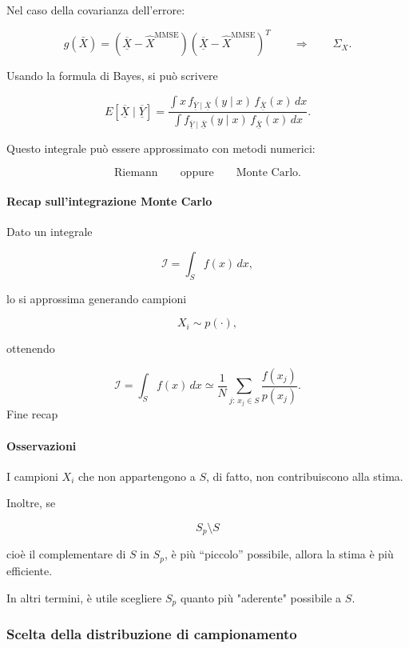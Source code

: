 \documentclass[11pt,a4paper]{article}
\begin{document}
Nel caso della covarianza dell'errore:

\[
g(\bar X)
=
(\overline{\underline{X}}-\hat X^{\mathrm{MMSE}})
(\overline{\underline{X}}-\hat X^{\mathrm{MMSE}})^T
\qquad \Rightarrow \qquad
\Sigma_X.
\]

Usando la formula di Bayes, si può scrivere

\[
E[\overline{\underline{X}}\mid \overline{\underline{Y}}]
=
\frac{
\displaystyle
\int x\, f_{\overline{\underline{Y}}\mid \overline{\underline{X}}}(y\mid x)\,f_{\overline{\underline{X}}}(x)\,dx
}{
\displaystyle
\int f_{\overline{\underline{Y}}\mid \overline{\underline{X}}}(y\mid x)\,f_{\overline{\underline{X}}}(x)\,dx
}.
\]

Questo integrale può essere approssimato con metodi numerici:

\[
\text{Riemann}
\qquad \text{oppure} \qquad
\text{Monte Carlo}.
\]

\paragraph{Recap sull'integrazione Monte Carlo}

Dato un integrale

\[
\mathcal{I}=\int_S f(x)\,dx,
\]

lo si approssima generando campioni

\[
X_i\sim p(\cdot),
\]

ottenendo

\[
\mathcal{I}
=
\int_S f(x)\,dx
\simeq
\frac{1}{N}
\sum_{j:\,x_j\in S}
\frac{f(x_j)}{p(x_j)}.
\]
Fine recap

\paragraph{Osservazioni}

I campioni \(X_i\) che non appartengono a \(S\), di fatto, non contribuiscono alla stima.

Inoltre, se

\[
S_p\setminus S
\]

cioè il complementare di \(S\) in \(S_p\), è più ``piccolo'' possibile, allora la stima è più efficiente.

In altri termini, è utile scegliere \(S_p\) quanto più "aderente" possibile a \(S\).


\subsubsection*{Scelta della distribuzione di campionamento}
\end{document}
